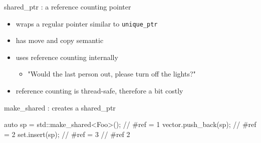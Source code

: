 \begin{frame}[fragile]
  \begin{block}{shared\_ptr : a reference counting pointer}
    \begin{itemize}
    \item wraps a regular pointer similar to \texttt{unique_ptr}
    \item has move and copy semantic
    \item uses reference counting internally
      \begin{itemize}
      \item "Would the last person out, please turn off the lights?"
      \end{itemize}
    \item reference counting is thread-safe, therefore a bit costly
    \end{itemize}
  \end{block}
  \begin{block}{make\_shared : creates a shared\_ptr}
    \begin{cppcode*}{}
      {
        auto sp = std::make_shared<Foo>(); // #ref = 1
        vector.push_back(sp);              // #ref = 2
        set.insert(sp);                    // #ref = 3
      } // #ref 2
    \end{cppcode*}
  \end{block}
\end{frame}

